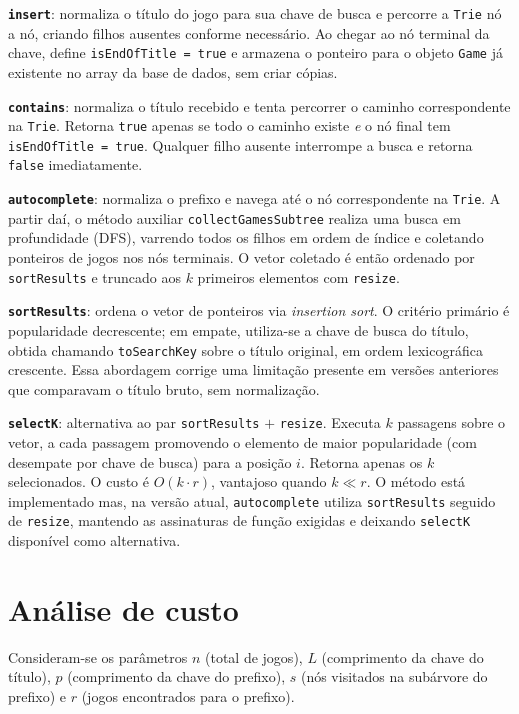 \documentclass[11pt,a4paper]{article}
\begin{document}
\textbf{\texttt{insert}}: normaliza o título do jogo para sua chave de busca e percorre a \texttt{Trie} nó a nó, criando filhos ausentes conforme necessário. Ao chegar ao nó terminal da chave, define \texttt{isEndOfTitle = true} e armazena o ponteiro para o objeto \texttt{Game} já existente no array da base de dados, sem criar cópias.
 
\textbf{\texttt{contains}}: normaliza o título recebido e tenta percorrer o caminho correspondente na \texttt{Trie}. Retorna \texttt{true} apenas se todo o caminho existe \emph{e} o nó final tem \texttt{isEndOfTitle = true}. Qualquer filho ausente interrompe a busca e retorna \texttt{false} imediatamente.
 
\textbf{\texttt{autocomplete}}: normaliza o prefixo e navega até o nó correspondente na \texttt{Trie}. A partir daí, o método auxiliar \texttt{collectGamesSubtree} realiza uma busca em profundidade (DFS), varrendo todos os filhos em ordem de índice e coletando ponteiros de jogos nos nós terminais. O vetor coletado é então ordenado por \texttt{sortResults} e truncado aos $k$ primeiros elementos com \texttt{resize}.
 
\textbf{\texttt{sortResults}}: ordena o vetor de ponteiros via \textit{insertion sort}. O critério primário é popularidade decrescente; em empate, utiliza-se a chave de busca do título, obtida chamando \texttt{toSearchKey} sobre o título original, em ordem lexicográfica crescente. Essa abordagem corrige uma limitação presente em versões anteriores que comparavam o título bruto, sem normalização.
 
\textbf{\texttt{selectK}}: alternativa ao par \texttt{sortResults} $+$ \texttt{resize}. Executa $k$ passagens sobre o vetor, a cada passagem promovendo o elemento de maior popularidade (com desempate por chave de busca) para a posição $i$. Retorna apenas os $k$ selecionados. O custo é $O(k \cdot r)$, vantajoso quando $k \ll r$. O método está implementado mas, na versão atual, \texttt{autocomplete} utiliza \texttt{sortResults} seguido de \texttt{resize}, mantendo as assinaturas de função exigidas e deixando \texttt{selectK} disponível como alternativa.
 
\section*{Análise de custo}
 
Consideram-se os parâmetros $n$ (total de jogos), $L$ (comprimento da chave do título), $p$ (comprimento da chave do prefixo), $s$ (nós visitados na subárvore do prefixo) e $r$ (jogos encontrados para o prefixo).
 
\end{document}
